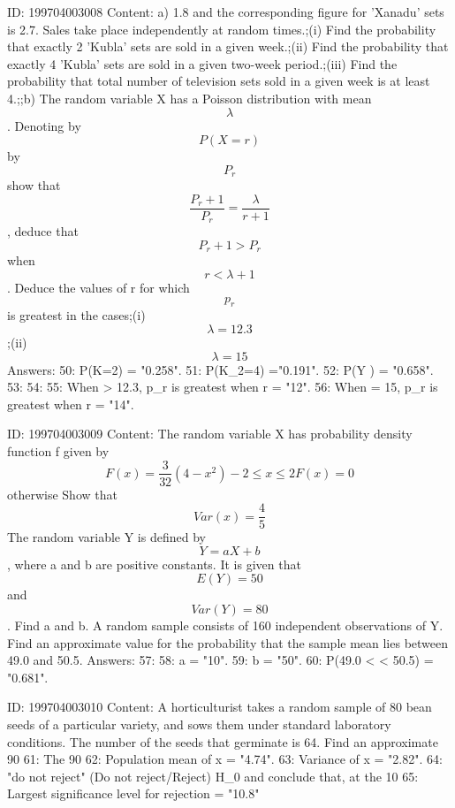 \documentclass{article}
\begin{document}
ID: 199704003008
Content:
a) 1.8 and the corresponding figure for 'Xanadu' sets is 2.7. Sales take place independently at random times.;(i) Find the probability that exactly 2 'Kubla' sets are sold in a given week.;(ii) Find the probability that exactly 4 'Kubla' sets are sold in a given two-week period.;(iii) Find the probability that total number of television sets sold in a given week is at least 4.;;b) The random variable X has a Poisson distribution with mean $$\lambda$$. Denoting  by $$P(X = r)$$ by $$P_r$$ show that $$\frac{P_r + 1}{P_r} = \frac{\lambda}{r+1}$$, deduce that $$P_r + 1 > P_r$$ when  $$r < \lambda + 1$$. Deduce the values of r for which $$p_r$$ is greatest in the cases;(i)  $$\lambda = 12.3$$;(ii) $$\lambda = 15$$Answers:
50: P(K=2) = "0.258".
51: P(K_2=4) ="0.191".
52: P(Y ) = "0.658".
53: 
54: 
55: When \lambda > 12.3, p_r is greatest when r = "12".
56: When \lambda = 15, p_r is greatest when r = "14".

ID: 199704003009
Content:
The random variable X has probability density function f given by $$F(x) = \frac{3}{32} ( 4-x^{2})  -2 \leq x \leq 2  F(x) = 0$$ otherwise Show that $$Var (x) = \frac{4}{5}$$ The random variable Y is defined by $$Y = aX + b$$, where a and b are positive constants. It is given that $$E(Y)=50$$ and $$Var(Y)=80$$. Find a and b. A random sample consists of 160 independent observations of Y. Find an approximate value for the probability that the sample mean lies between 49.0 and 50.5. Answers:
57: 
58: a = "10".
59: b = "50".
60: P(49.0 <  < 50.5) = "0.681".

ID: 199704003010
Content:
A horticulturist takes a random sample of 80 bean seeds of a particular variety, and sows them under standard laboratory conditions. The number of the seeds that germinate is 64. Find an approximate 90%
61: The 90%
62: Population mean of x = "4.74".
63: Variance of x = "2.82".
64: "do not reject" (Do not reject/Reject) H_0 and conclude that, at the 10%
65: Largest significance level for rejection = "10.8"%
\end{document}
